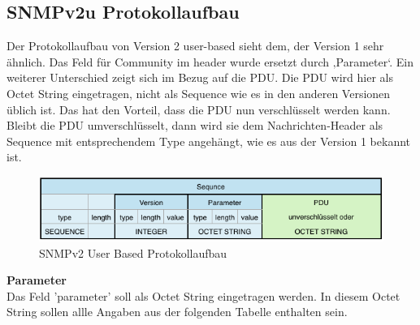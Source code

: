\documentclass[11pt,a4paper]{article}
\begin{document}
\subsection{SNMPv2u Protokollaufbau}
Der Protokollaufbau von Version 2 user-based sieht dem, der Version 1 sehr ähnlich. Das Feld für Community im header wurde ersetzt durch ‚Parameter‘. Ein weiterer Unterschied zeigt sich im Bezug auf die PDU. Die PDU wird hier als Octet String eingetragen, nicht als Sequence wie es in den anderen Versionen üblich ist. Das hat den Vorteil, dass die PDU nun verschlüsselt werden kann. Bleibt die PDU umverschlüsselt, dann wird sie dem Nachrichten-Header als Sequence mit entsprechendem Type angehängt, wie es aus der Version 1 bekannt ist.\\
\begin{figure}[h]
	\centering
	\includegraphics[scale=.8]{Bilder/SNMPv2u-Protokollaufbau}
	\caption{SNMPv2 User Based Protokollaufbau}
\end{figure}
\textbf{Parameter}\\
Das Feld 'parameter' soll als Octet String eingetragen werden. In diesem Octet String sollen allle Angaben aus der folgenden Tabelle enthalten sein.\\
\emptyline
\end{document}
